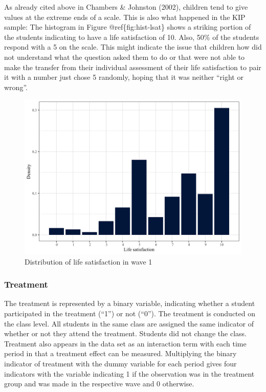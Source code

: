 \documentclass[a4, 12pt]{article}
\begin{document}
As already cited above in Chambers \& Johnston (2002), children tend to give values at the extreme ends of a scale. This is also what happened in the KIP sample: The histogram in Figure @ref\{fig:hist-lsat\} shows a striking portion of the students indicating to have a life satisfaction of 10. Also, 50\% of the students respond with a 5 on the scale. This might indicate the issue that children how did not understand what the question asked them to do or that were not able to make the transfer from their individual assessment of their life satisfaction to pair it with a number just chose 5 randomly, hoping that it was neither ``right or wrong''.

\begin{figure}

{\centering \includegraphics[width=0.8\linewidth]{../figures/lsat_bar} 

}

\caption{Distribution of life satisfaction in wave 1}\label{fig:hist-lsat}
\end{figure}

\hypertarget{treatment}{%
\subsubsection{Treatment}\label{treatment}}

The treatment is represented by a binary variable, indicating whether a student participated in the treatment (``1'') or not (``0''). The treatment is conducted on the class level. All students in the same class are assigned the same indicator of whether or not they attend the treatment. Students did not change the class. Treatment also appears in the data set as an interaction term with each time period in that a treatment effect can be measured. Multiplying the binary indicator of treatment with the dummy variable for each period gives four indicators with the variable indicating 1 if the observation was in the treatment group and was made in the respective wave and 0 otherwise.
\end{document}
